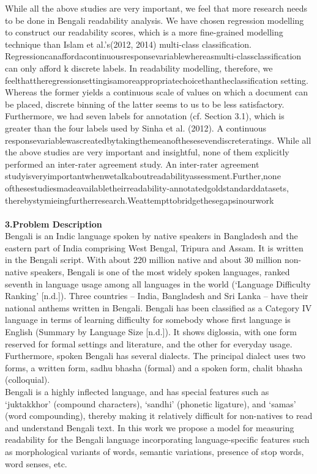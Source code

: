 \documentclass[9pt]{article}
\begin{document}
While all the above studies are very important, we feel that more research needs to be done in Bengali readability analysis. We have chosen regression modelling to construct our readability scores, which is a more ﬁne-grained modelling technique than Islam et al.’s(2012, 2014) multi-class classiﬁcation. Regressioncanaﬀordacontinuousresponsevariablewhereasmulti-classclassiﬁcation can only aﬀord k discrete labels. In readability modelling, therefore, we feelthattheregressionsettingisamoreappropriatechoicethantheclassiﬁcation setting. Whereas the former yields a continuous scale of values on which a document can be placed, discrete binning of the latter seems to us to be less satisfactory. Furthermore, we had seven labels for annotation (cf. Section 3.1), which is greater than the four labels used by Sinha et al. (2012). A continuous responsevariablewascreatedbytakingthemeanofthesesevendiscreteratings. While all the above studies are very important and insightful, none of them explicitly performed an inter-rater agreement study. An inter-rater agreement studyisveryimportantwhenwetalkaboutreadabilityassessment.Further,none ofthesestudiesmadeavailabletheirreadability-annotatedgoldstandarddatasets, therebystymieingfurtherresearch.Weattempttobridgethesegapsinourwork\\
\\
\huge{\textbf{3.Problem Description}}\\
Bengali is an Indic language spoken by native speakers in Bangladesh and the eastern part of India comprising West Bengal, Tripura and Assam. It is 
written in the Bengali script. With about 220 million native and about 30 million non-native speakers, Bengali is one of the most widely spoken languages, ranked seventh in language usage among all languages in the world (‘Language Diﬃculty Ranking’ [n.d.]). Three countries – India, Bangladesh and Sri Lanka – have their national anthems written in Bengali. Bengali has been classiﬁed as a Category IV language in terms of learning diﬃculty for somebody whose ﬁrst language is English (Summary by Language Size [n.d.]). It shows diglossia, with one form reserved for formal settings and literature, and the other for everyday usage. Furthermore, spoken Bengali has several dialects. The principal dialect uses two forms, a written form, sadhu bhasha (formal) and a spoken form, chalit bhasha (colloquial).\\
Bengali is a highly inﬂected language, and has special features such as ‘juktakkhor’ (compound characters), ‘sandhi’ (phonetic ligature), and ‘samas’ (word compounding), thereby making it relatively diﬃcult for non-natives to read and understand Bengali text. In this work we propose a model for measuring readability for the Bengali language incorporating language-speciﬁc features such as morphological variants of words, semantic variations, presence of stop words, word senses, etc.\\
\\
\end{document}
